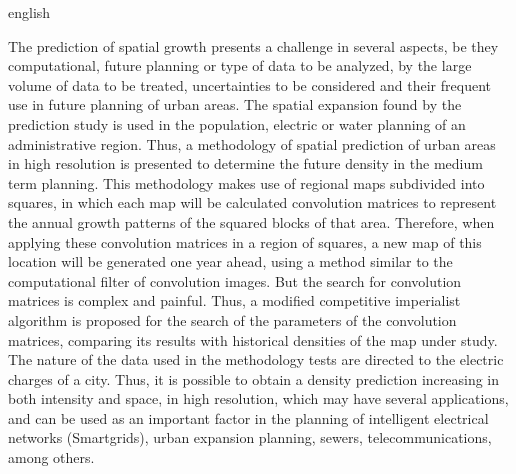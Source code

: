 \begin{resumo}[Abstract]
 \begin{otherlanguage*}{english}

The prediction of spatial growth presents a challenge in several aspects, be they computational, future planning or type of data to be analyzed, by the large volume of data to be treated, uncertainties to be considered and their frequent use in future planning of urban areas. The spatial expansion found by the prediction study is used in the population, electric or water planning of an administrative region. Thus, a methodology of spatial prediction of urban areas in high resolution is presented to determine the future density in the medium term planning. This methodology makes use of regional maps subdivided into squares, in which each map will be calculated convolution matrices to represent the annual growth patterns of the squared blocks of that area. Therefore, when applying these convolution matrices in a region of squares, a new map of this location will be generated one year ahead, using a method similar to the computational filter of convolution images. But the search for convolution matrices is complex and painful. Thus, a modified competitive imperialist algorithm is proposed for the search of the parameters of the convolution matrices, comparing its results with historical densities of the map under study. The nature of the data used in the methodology tests are directed to the electric charges of a city. Thus, it is possible to obtain a density prediction increasing in both intensity and space, in high resolution, which may have several applications, and can be used as an important factor in the planning of intelligent electrical networks (Smartgrids), urban expansion planning, sewers, telecommunications, among others.



 \end{otherlanguage*}
\end{resumo}